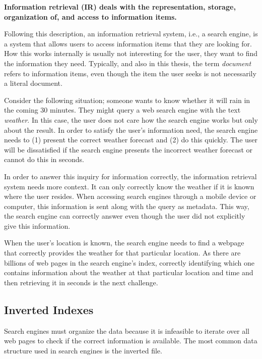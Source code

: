\medskip
\textbf{Information retrieval (IR) deals with the representation, storage, organization of, and access to information items.}

\medskip
Following this description, an information retrieval system, i.e., a search engine, is a system that allows users to access information items that they are looking for. How this works internally is usually not interesting for the user, they want to find the information they need. Typically, and also in this thesis, the term \emph{document} refers to information items, even though the item the user seeks is not necessarily a literal document. 

Consider the following situation; someone wants to know whether it will rain in the coming 30 minutes. They might query a web search engine with the text \emph{weather}. In this case, the user does not care how the search engine works but only about the result. In order to satisfy the user's information need, the search engine needs to (1) present the correct weather forecast and (2) do this quickly. The user will be dissatisfied if the search engine presents the incorrect weather forecast or cannot do this in seconds.

In order to answer this inquiry for information correctly, the information retrieval system needs more context. It can only correctly know the weather if it is known where the user resides. When accessing search engines through a mobile device or computer, this information is sent along with the query as metadata. This way, the search engine can correctly answer even though the user did not explicitly give this information. 

When the user's location is known, the search engine needs to find a webpage that correctly provides the weather for that particular location. As there are billions of web pages in the search engine's index, correctly identifying which one contains information about the weather at that particular location and time and then retrieving it in seconds is the next challenge.

\subsection{Inverted Indexes}
Search engines must organize the data because it is infeasible to iterate over all web pages to check if the correct information is available. The most common data structure used in search engines is the inverted file.

